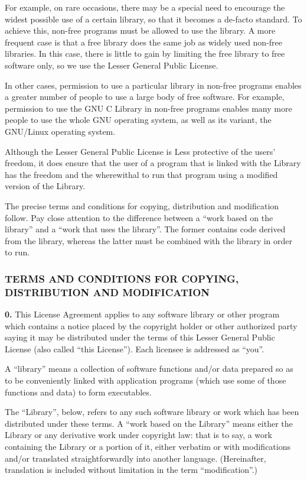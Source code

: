 \documentclass[]{article}
\begin{document}
For example, on rare occasions, there may be a special need to encourage
the widest possible use of a certain library, so that it becomes a
de-facto standard. To achieve this, non-free programs must be allowed to
use the library. A more frequent case is that a free library does the
same job as widely used non-free libraries. In this case, there is
little to gain by limiting the free library to free software only, so we
use the Lesser General Public License.

In other cases, permission to use a particular library in non-free
programs enables a greater number of people to use a large body of free
software. For example, permission to use the GNU C Library in non-free
programs enables many more people to use the whole GNU operating system,
as well as its variant, the GNU/Linux operating system.

Although the Lesser General Public License is Less protective of the
users' freedom, it does ensure that the user of a program that is linked
with the Library has the freedom and the wherewithal to run that program
using a modified version of the Library.

The precise terms and conditions for copying, distribution and
modification follow. Pay close attention to the difference between a
``work based on the library'' and a ``work that uses the library''. The
former contains code derived from the library, whereas the latter must
be combined with the library in order to run.

\subsubsection{TERMS AND CONDITIONS FOR COPYING, DISTRIBUTION AND
MODIFICATION}

\textbf{0.} This License Agreement applies to any software library or
other program which contains a notice placed by the copyright holder or
other authorized party saying it may be distributed under the terms of
this Lesser General Public License (also called ``this License''). Each
licensee is addressed as ``you''.

A ``library'' means a collection of software functions and/or data
prepared so as to be conveniently linked with application programs
(which use some of those functions and data) to form executables.

The ``Library'', below, refers to any such software library or work
which has been distributed under these terms. A ``work based on the
Library'' means either the Library or any derivative work under
copyright law: that is to say, a work containing the Library or a
portion of it, either verbatim or with modifications and/or translated
straightforwardly into another language. (Hereinafter, translation is
included without limitation in the term ``modification''.)
\end{document}
